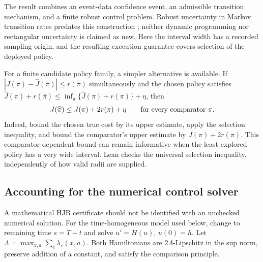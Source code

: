 The result combines an event-data confidence event, an admissible transition mechanism, and a finite robust control problem. Robust uncertainty in Markov transition rates predates this construction \citep{kalyanasundaram2004}; neither dynamic programming nor rectangular uncertainty is claimed as new. Here the interval width has a recorded sampling origin, and the resulting execution guarantee covers selection of the deployed policy.

For a finite candidate policy family, a simpler alternative is available. If
$|J(\pi)-\widehat J(\pi)|\le r(\pi)$ simultaneously and the chosen policy satisfies
$\widehat J(\widehat\pi)+r(\widehat\pi)
\le\inf_\pi\{\widehat J(\pi)+r(\pi)\}+\eta$, then
\begin{equation}\label{eq:pessimistic-oracle}
 J(\widehat\pi)\le J(\pi)+2r(\pi)+\eta\qquad\hbox{for every comparator }\pi.
\end{equation}
Indeed, bound the chosen true cost by its upper estimate, apply the selection inequality, and bound the comparator's upper estimate by $J(\pi)+2r(\pi)$. This comparator-dependent bound can remain informative when the least explored policy has a very wide interval. Lean checks the universal selection inequality, independently of how valid radii are supplied.

\subsection{Accounting for the numerical control solver}
A mathematical HJB certificate should not be identified with an unchecked numerical solution. For the time-homogeneous model used below, change to remaining time $s=T-t$ and solve $u'=H(u)$, $u(0)=h$. Let
$\Lambda=\max_{x,a}\sum_e\overline\lambda_e(x,a)$.
Both Hamiltonians are $2\Lambda$-Lipschitz in the sup norm, preserve addition of a constant, and satisfy the comparison principle.


